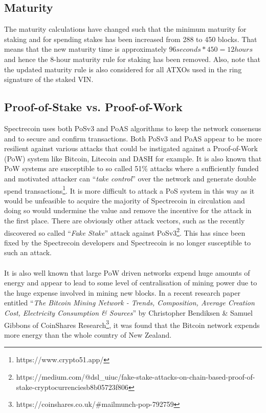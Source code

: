 \subsection{Maturity}
The maturity calculations have changed such that the minimum maturity for
staking and for spending stakes has been increased from 288 to 450 blocks. That means that the new maturity time is approximately $96 seconds * 450 = 12 hours$ and hence the 8-hour maturity rule for staking has been removed. Also, note that the updated maturity rule is also considered for all ATXOs used in the ring signature
of the staked VIN.
\newpage

\subsection{Proof-of-Stake vs. Proof-of-Work}
Spectrecoin uses both PoSv3 and PoAS algorithms to keep the network consensus and to secure and confirm transactions. Both PoSv3 and PoAS appear to be more resilient against various attacks that could be instigated against a Proof-of-Work (PoW) system like Bitcoin, Litecoin and DASH for example. It is also known that PoW systems are susceptible to so called 51\% attacks where a sufficiently funded and motivated attacker can “\textit{take control}” over the network and generate double spend transactions\footnote{https://www.crypto51.app/}. It is more difficult to attack a PoS system in this way as it would be unfeasible to acquire the majority of Spectrecoin in circulation and doing so would undermine the value and remove the incentive for the attack in the first place. There are obviously other attack vectors, such as the recently discovered so called “\textit{Fake Stake}” attack against PoSv3\footnote{https://medium.com/@dsl\_uiuc/fake-stake-attacks-on-chain-based-proof-of-stake-cryptocurrenciesb8b05723f806}. This has since been fixed by the Spectrecoin developers and Spectrecoin is no longer susceptible to such an attack.
\\
\\
\noindent
It is also well known that large PoW driven networks expend huge amounts of energy and appear to lead to some level of centralisation of mining power due to the huge expense involved in mining new blocks. In a recent research paper entitled “\textit{The Bitcoin Mining Network - Trends, Composition, Average Creation Cost, Electricity Consumption \& Sources}” by Christopher Bendiksen \& Samuel Gibbons of CoinShares  Research\footnote{https://coinshares.co.uk/\#mailmunch-pop-792759}, 
it was found that the Bitcoin network expends more energy than the whole country of New Zealand.
